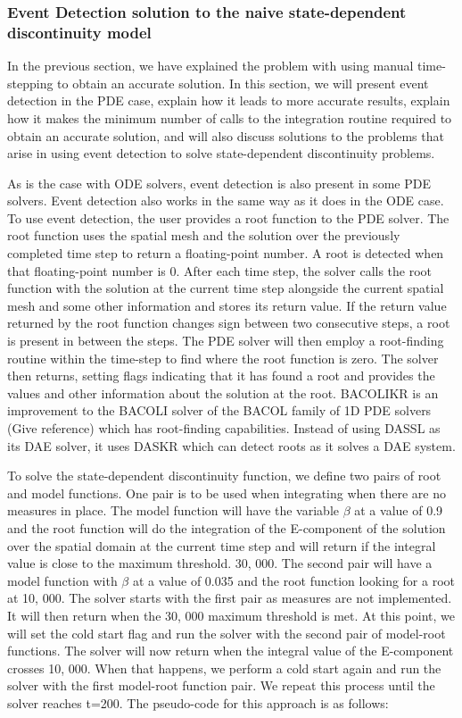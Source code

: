 \documentclass{article}
\begin{document}
\subsubsection{Event Detection solution to the naive state-dependent discontinuity model}
\label{subsubsection:pde_state_event_detection}
In the previous section, we have explained the problem with using manual time-stepping to obtain an accurate solution. In this section, we will present event detection in the PDE case, explain how it leads to more accurate results, explain how it makes the minimum number of calls to the integration routine required to obtain an accurate solution, and will also discuss solutions to the problems that arise in using event detection to solve state-dependent discontinuity problems.

As is the case with ODE solvers, event detection is also present in some PDE solvers. Event detection also works in the same way as it does in the ODE case. To use event detection, the user provides a root function to the PDE solver. The root function uses the spatial mesh and the solution over the previously completed time step to return a floating-point number. A root is detected when that floating-point number is 0. After each time step, the solver calls the root function with the solution at the current time step alongside the current spatial mesh and some other information and stores its return value. If the return value returned by the root function changes sign between two consecutive steps, a root is present in between the steps. The PDE solver will then employ a root-finding routine within the time-step to find where the root function is zero. The solver then returns, setting flags indicating that it has found a root and provides the values and other information about the solution at the root.
BACOLIKR is an improvement to the BACOLI solver of the BACOL family of 1D PDE solvers (Give reference) which has root-finding capabilities. Instead of using DASSL as its DAE solver, it uses DASKR which can detect roots as it solves a DAE system. 

To solve the state-dependent discontinuity function, we define two pairs of root and model functions. One pair is to be used when integrating when there are no measures in place. The model function will have the variable $\beta$ at a value of 0.9 and the root function will do the integration of the E-component of the solution over the spatial domain at the current time step and will return if the integral value is close to the maximum threshold. 30, 000. The second pair will have a model function with $\beta$ at a value of 0.035 and the root function looking for a root at 10, 000. The solver starts with the first pair as measures are not implemented. It will then return when the 30, 000 maximum threshold is met. At this point, we will set the cold start flag and run the solver with the second pair of model-root functions. The solver will now return when the integral value of the E-component crosses 10, 000. When that happens, we perform a cold start again and run the solver with the first model-root function pair. We repeat this process until the solver reaches t=200. The pseudo-code for this approach is as follows:
\end{document}
